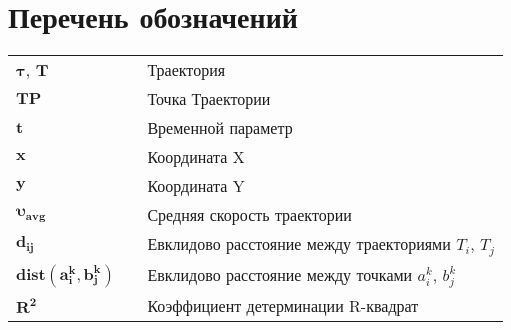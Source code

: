 \section*{Перечень обозначений}
\label{ch:Перечень обозначений}

\begin{tabular}{lll}
	\\
	$\bm{\tau}$, $\bm{T}$       	& & {Траектория} \\[0.5ex]
	$\bm{TP}$        				& & {Точка Траектории} \\[0.5ex]
	$\bm{t}$						& & {Временной параметр} \\[0.5ex]
	$\bm{x}$						& & {Координата X} \\[0.5ex]
	$\bm{y}$						& & {Координата Y} \\[0.5ex]
	$\bm{\upsilon_{avg}}$			& & {Средняя скорость траектории} \\[0.5ex]
	$\bm{d_{ij}}$					& & {Евклидово расстояние между траекториями $T_i$, $T_j$} \\[0.5ex]
	$\bm{dist(a_i^k, b_j^k)}$		& & {Евклидово расстояние между точками $a_i^k$, $b_j^k$} \\[0.5ex]
	$\bm{R^2}$						& & {Коэффициент детерминации R-квадрат} \\[0.5ex]
	
\end{tabular}
